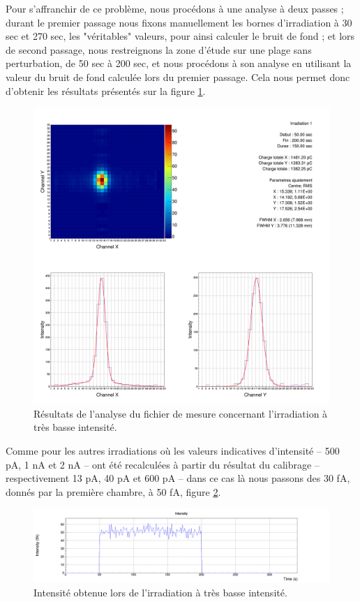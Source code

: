 \documentclass[a4paper,11pt]{article}
\begin{document}
Pour s'affranchir de ce problème, nous procédons à une analyse à deux passes ; durant le premier passage nous fixons manuellement les bornes d'irradiation à 30 sec et 270 sec, les "véritables" valeurs, pour ainsi calculer le bruit de fond ; et lors de second passage, nous restreignons la zone d'étude sur une plage sans perturbation, de 50 sec à 200 sec, et nous procédons à son analyse en utilisant la valeur du bruit de fond calculée lors du premier passage.
Cela nous permet donc d'obtenir les résultats présentés sur la figure \ref{fig:bianalyse}. 
\begin{figure}[h]
\begin{center}
\includegraphics[width=1.\linewidth]{Area_1_bi.png} 
\caption{\label{fig:bianalyse}\footnotesize{Résultats de l'analyse du fichier de mesure concernant l'irradiation à très basse intensité.}}
\end{center}
\end{figure}

Comme pour les autres irradiations où les valeurs indicatives d'intensité -- 500 pA, 1 nA et 2 nA -- ont été recalculées à partir du résultat du calibrage -- respectivement 13 pA, 40 pA et 600 pA -- dans ce cas là nous passons des 30 fA, donnés par la première chambre, à 50 fA, figure \ref{fig:biintensity}.
\begin{figure}[h]
\begin{center}
\includegraphics[width=1.\linewidth]{Intensity_clean.png} 
\caption{\label{fig:biintensity}\footnotesize{Intensité obtenue lors de l'irradiation à très basse intensité.}}
\end{center}
\end{figure}

\end{document}
